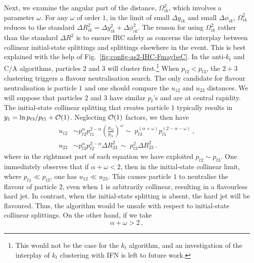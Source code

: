\documentclass[nofootinbib,twocolumn,preprintnumbers,superscriptaddress,aps]{revtex4-2}
\newcommand{\order}[1]{{\cal O}\!\left(#1\right)}
\begin{document}
Next, we examine the angular part of the distance, $\Omega_{ik}^2$,
which involves a parameter $\omega$.
%
For any $\omega$ of order $1$, in the limit of small $\Delta y_{ik}$ and
small $\Delta \phi_{ik}$, $\Omega_{ik}^2$ reduces to the standard $\Delta R_{ik}^2
= \Delta y_{ik}^2 + \Delta \phi_{ik}^2$.
%
The reason for using $\Omega_{ik}^2$ rather than the standard
$\Delta R^2$ is to ensure IRC safety as concerns the interplay between
collinear initial-state splittings and splittings elsewhere in the
event.
%
This is best explained with the help of
Fig.~\ref{fig:config-as2-IHC-FmaybeC}. 
%
In the anti-$k_t$ and C/A algorithms, particles $2$ and $3$ will
cluster first.\footnote{This would not be the case for the $k_t$
  algorithm, and an investigation of the interplay of $k_t$ clustering
  with IFN is left to future work.}
%
%
When $p_{t2} < p_{t3}$, the $2+3$ clustering triggers a flavour
neutralisation search.
%
The only candidate for flavour neutralisation is particle $1$ and one
should compare the $u_{12}$ and $u_{23}$ distances.
%
We will suppose that particles $2$ and $3$ have similar $p_{t}$'s and
are at central rapidity.
%
The initial-state collinear splitting that creates particle $1$
typically results in $y_{1} = \ln p_{t3}/p_{t1} + \order{1}$.
%
Neglecting $\order{1}$ factors, we then have
\begin{subequations}
  \begin{align}
    u_{12} &\sim
             p_{t2}^\alpha p_{t1}^{2-\alpha} \left(\frac{p_{t3}}{p_{t1}}\right)^\omega
             \sim\;  p_{t3}^{(\alpha+\omega)} p_{t1}^{(2-\alpha - \omega)}\,,
    \\
    u_{23} &\sim
             p_{t3}^\alpha p_{t2}^{2-\alpha} \Delta R_{23}^2
             \,\sim\;
             p_{t3}^2 \Delta R_{23}^2\,.
  \end{align}
\end{subequations}
where in the rightmost part of each equation we have exploited $p_{t2}
\sim p_{t3}$.
%
One immediately observes that if $\alpha + \omega < 2$, then in the
initial-state collinear limit, where $p_{t1} \ll p_{t3}$, one has
$u_{12} \ll u_{23}$.
%
This causes particle $1$ to neutralise the flavour of particle
$2$, even when $1$ is arbitrarily collinear, resulting in a
flavourless hard jet.
%
In contrast, when the initial-state splitting is absent, the hard jet
will be flavoured.
%
Thus, the algorithm would be unsafe with respect to initial-state collinear
splittings.
%
On the other hand, if we take
\begin{equation}
  \label{eq:omega-constraint}
  \alpha + \omega > 2 \,,
\end{equation}
\end{document}
